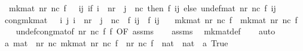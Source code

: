 \begin{isabellebody}
\ \ {\isachardoublequoteopen}mk{\isacharunderscore}{\kern0pt}mat\ nr\ nc\ f\ {\isasymequiv}\ {\isasymlambda}\ {\isacharparenleft}{\kern0pt}i{\isacharcomma}{\kern0pt}j{\isacharparenright}{\kern0pt}{\isachardot}{\kern0pt}\ if\ i\ {\isacharless}{\kern0pt}\ nr\ {\isasymand}\ j\ {\isacharless}{\kern0pt}\ nc\ then\ f\ {\isacharparenleft}{\kern0pt}i{\isacharcomma}{\kern0pt}j{\isacharparenright}{\kern0pt}\ else\ undef{\isacharunderscore}{\kern0pt}mat\ nr\ nc\ f\ {\isacharparenleft}{\kern0pt}i{\isacharcomma}{\kern0pt}j{\isacharparenright}{\kern0pt}{\isachardoublequoteclose}\isanewline
\isanewline
{}\isamarkupfalse%
\ cong{\isacharunderscore}{\kern0pt}mk{\isacharunderscore}{\kern0pt}mat{\isacharcolon}{\kern0pt}\ \ {\isachardoublequoteopen}{\isasymAnd}\ i\ j{\isachardot}{\kern0pt}\ i\ {\isacharless}{\kern0pt}\ nr\ {\isasymLongrightarrow}\ j\ {\isacharless}{\kern0pt}\ nc\ {\isasymLongrightarrow}\ f\ {\isacharparenleft}{\kern0pt}i{\isacharcomma}{\kern0pt}j{\isacharparenright}{\kern0pt}\ {\isacharequal}{\kern0pt}\ f{\isacharprime}{\kern0pt}\ {\isacharparenleft}{\kern0pt}i{\isacharcomma}{\kern0pt}j{\isacharparenright}{\kern0pt}{\isachardoublequoteclose}\isanewline
\ \ \ {\isachardoublequoteopen}mk{\isacharunderscore}{\kern0pt}mat\ nr\ nc\ f\ {\isacharequal}{\kern0pt}\ mk{\isacharunderscore}{\kern0pt}mat\ nr\ nc\ f{\isacharprime}{\kern0pt}{\isachardoublequoteclose}\isanewline
%
\isadelimproof
\ \ %
\endisadelimproof
%
\isatagproof
{}\isamarkupfalse%
\ undef{\isacharunderscore}{\kern0pt}cong{\isacharunderscore}{\kern0pt}mat{\isacharbrackleft}{\kern0pt}of\ nr\ nc\ f\ f{\isacharprime}{\kern0pt}{\isacharcomma}{\kern0pt}\ OF\ assms{\isacharbrackright}{\kern0pt}\isanewline
\ \ \isamarkupfalse%
\ assms\ \isamarkupfalse%
\ mk{\isacharunderscore}{\kern0pt}mat{\isacharunderscore}{\kern0pt}def\isanewline
\ \ \isamarkupfalse%
\ auto%
\endisatagproof
{\isafoldproof}%
%
\isadelimproof
\isanewline
%
\endisadelimproof
\isanewline
{}\isamarkupfalse%
\ {\isacharprime}{\kern0pt}a\ mat\ {\isacharequal}{\kern0pt}\ {\isachardoublequoteopen}{\isacharbraceleft}{\kern0pt}{\isacharparenleft}{\kern0pt}nr{\isacharcomma}{\kern0pt}\ nc{\isacharcomma}{\kern0pt}\ mk{\isacharunderscore}{\kern0pt}mat\ nr\ nc\ f{\isacharparenright}{\kern0pt}\ {\isacharbar}{\kern0pt}\ nr\ nc\ f\ {\isacharcolon}{\kern0pt}{\isacharcolon}{\kern0pt}\ nat\ {\isasymtimes}\ nat\ {\isasymRightarrow}\ {\isacharprime}{\kern0pt}a{\isachardot}{\kern0pt}\ True{\isacharbraceright}{\kern0pt}{\isachardoublequoteclose}\isanewline

\end{isabellebody}
